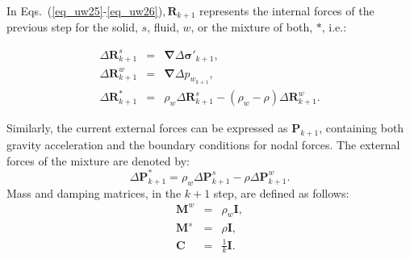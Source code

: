 \documentclass[twocolumn]{svjour3}          %
\begin{document}
In Eqs.~(\ref{eq_uw25}-\ref{eq_uw26})$, \boldsymbol{R}_{k+1}$ represents the internal forces of the previous step for the solid, $s$, fluid, $w$, or the mixture of both, $*$, i.e.:

\begin{eqnarray*}
\Delta\boldsymbol{R}^s_{k+1}&=&\boldsymbol{ \nabla }\Delta\boldsymbol{ \sigma'}_{k+1}, \\
\Delta\boldsymbol{R}^w_{k+1}&=&\boldsymbol{ \nabla }\Delta p_{w_{k+1}}, \\
\Delta\boldsymbol{R}^*_{k+1}&=&\rho_{w} \Delta \boldsymbol{ R}^{s}_{k+1}-(\rho_{w} -\rho)\Delta \boldsymbol{R}^{w}_{k+1}.
\end{eqnarray*}

Similarly, the current external forces can be expressed as $ \boldsymbol{P}_{k+1}$, containing both gravity acceleration and the  boundary conditions for nodal forces. The external forces of the mixture are denoted by:
$$
\Delta\boldsymbol{P}^*_{k+1}=\rho_{w} \Delta\boldsymbol{P}_{k+1}^{s}-\rho \Delta\boldsymbol{P}_{k+1}^{w}.
$$
Mass and damping matrices, in the $k+1$ step, are defined as follows:
\begin{eqnarray*}
\boldsymbol{M}^w &=& \rho_{w}\boldsymbol{I} , \\
\boldsymbol{M}^s &=& \rho\boldsymbol{I} , \\
\boldsymbol{C} &=& \frac{1}{k}\boldsymbol{I} .
\end{eqnarray*}

\end{document}
